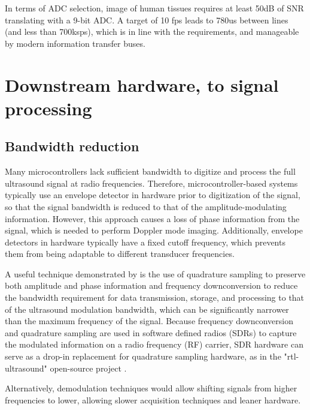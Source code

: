 \documentclass{article}
\begin{document}
In terms of ADC selection, image of human tissues requires at least 50dB of SNR \cite{attarzadeh_low-power_2017} translating with a 9-bit ADC. A target of 10 fps leads to 780us between lines (and less than 700ksps), which is in line with the requirements, and manageable by modern information transfer buses. 

\newpage
\section{Downstream hardware, to signal processing}

\subsection{Bandwidth reduction}
Many microcontrollers lack sufficient bandwidth to digitize and process the full ultrasound signal at radio frequencies. 
Therefore, microcontroller-based systems typically use an envelope detector in hardware prior to digitization of the signal, so that the signal bandwidth is reduced to that of the amplitude-modulating information. However, this approach causes a loss of phase information from the signal, which is needed to perform Doppler mode imaging. Additionally, envelope detectors in hardware typically have a fixed cutoff frequency, which prevents them from being adaptable to different transducer frequencies.

A useful technique demonstrated by \cite{peyton_comparison_2018} is the use of quadrature sampling to preserve both amplitude and phase information and frequency downconversion to reduce the bandwidth requirement for data transmission, storage, and processing to that of the ultrasound modulation bandwidth, which can be significantly narrower than the maximum frequency of the signal. Because frequency downconversion and quadrature sampling are used in software defined radios (SDRs) \cite{hager_design_2019, hager_lightprobe:_2019} to capture the modulated information on a radio frequency (RF) carrier, SDR hardware can serve as a drop-in replacement for quadrature sampling hardware, as in the "rtl-ultrasound" open-source project \cite{meng_rtl-ultrasound_2019}. 

Alternatively, demodulation techniques would allow shifting signals from higher frequencies to lower, allowing slower acquisition techniques and leaner hardware. 
\end{document}
